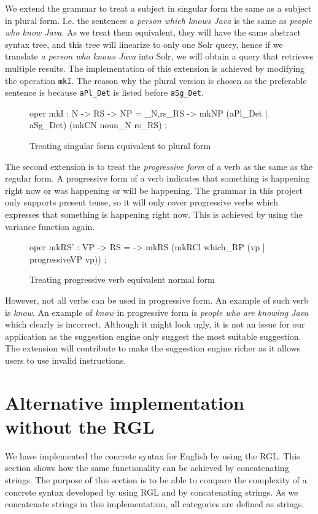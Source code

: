 We extend the grammar to treat a subject in singular form the same as a subject in plural form. I.e. the sentences \emph{a person which knows Java} is the same as \emph{people who know Java}. As we treat them equivalent, they will have the same abstract syntax tree, and this tree will linearize to only one Solr query, hence if we translate \emph{a person who knows Java} into Solr, we will obtain a query that retrieves multiple results. The implementation of this extension is achieved by modifying the operation \texttt{mkI}. The reason why the plural version is chosen as the preferable sentence is because \texttt{aPl\_Det} is listed before \texttt{aSg\_Det}.

\begin{figure}[H]
\begin{code}
oper
  mkI : N -> RS -> NP = \noun_N,rs_RS -> mkNP (aPl_Det | aSg_Det)
                             (mkCN noun_N rs_RS) ;
\end{code}
\caption{Treating singular form equivalent to plural form\label{fig:linearize-using-list}}
\end{figure}

The second extension is to treat the \emph{progressive form} of a verb as the same as the regular form. A progressive form of a verb indicates that something is happening right now or was happening or will be happening. The grammar in this project only supports present tense, so it will only cover progressive verbs which expresses that something is happening right now. This is achieved by using the variance function again.

\begin{figure}[H]
\begin{code}
oper
  mkRS' : VP -> RS = \vp -> mkRS (mkRCl which_RP (vp | progressiveVP vp)) ;
\end{code}
\caption{Treating progressive verb equivalent normal form\label{fig:linearize-using-list}}
\end{figure}

However, not all verbs can be used in progressive form. An example of such verb is \emph{know}. An example of  \emph{know} in progressive form is \emph{people who are knowing Java} which clearly is incorrect. Although it might look ugly, it is not an issue for our application as the suggestion engine only suggest the most suitable suggestion. The extension will contribute to make the suggestion engine richer as it allows users to use invalid instructions.

\section{Alternative implementation without the RGL}\label{sec:english-concat}
We have implemented the concrete syntax for English by using the RGL. This section shows how the same functionality can be achieved by concatenating strings. The purpose of this section is to be able to compare the complexity of a concrete syntax developed by using RGL and by concatenating strings.\newline
\newline
As we concatenate strings in this implementation, all categories are defined as strings.

